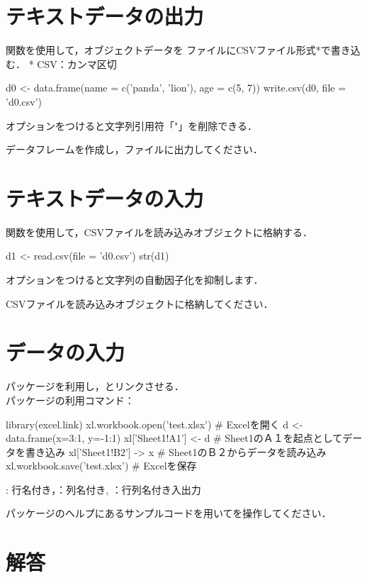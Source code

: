 \documentclass[../main]{subfiles}
\begin{document}
\tcbstartrecording\relax

\section{テキストデータの出力}

{
  関数を使用して，オブジェクトデータを
  ファイルにCSVファイル形式*で書き込む．
  * CSV：カンマ区切
}

\begin{ConsoleR}
  d0 <- data.frame(name = c('panda', 'lion'), 
                    age = c(5, 7))
  write.csv(d0, file = 'd0.csv')
\end{ConsoleR}

 オプションをつけると文字列引用符「"」を削除できる．

\begin{exercise}
  データフレームを作成し，ファイルに出力してください．
\tcblower
\end{exercise}

\section{テキストデータの入力}

{
  関数を使用して，CSVファイルを読み込みオブジェクトに格納する．
}

\begin{ConsoleR}
  d1 <- read.csv(file = 'd0.csv')
  str(d1)
\end{ConsoleR}

 オプションをつけると文字列の自動因子化を抑制します．

\begin{exercise}
  CSVファイルを読み込みオブジェクトに格納してください．
\tcblower
\end{exercise}

\section{\Excel データの入力}

{
  パッケージを利用し，\R とリンクさせる．\\
  パッケージの利用コマンド：
}

\begin{ConsoleR}
  library(excel.link)
  xl.workbook.open('test.xlsx') # Excelを開く
  d <- data.frame(x=3:1, y=-1:1)
  xl['Sheet1!A1'] <- d # Sheet1のＡ１を起点としてデータを書き込み
  xl['Sheet1!B2'] -> x # Sheet1のＢ２からデータを読み込み
  xl.workbook.save('test.xlsx') # Excelを保存
\end{ConsoleR}

: 行名付き，：列名付き, ：行列名付き入出力

\begin{exercise}
  パッケージのヘルプにあるサンプルコードを用いて\Excel を操作してください．
\tcblower
\end{exercise}


\tcbstoprecording
\section{解答}
\tcbinputrecords
\end{document}
